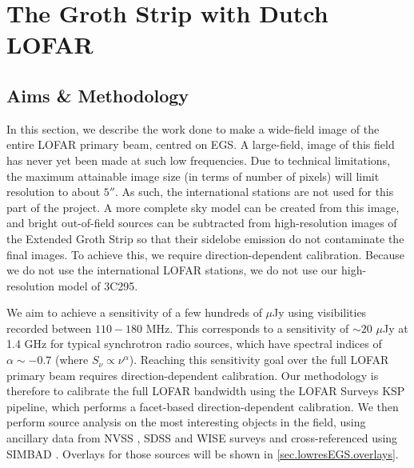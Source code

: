 \chapter{The Groth Strip with Dutch LOFAR}\label{section.EGS.lowres}
\minitoc
\section{Aims \& Methodology}

\pg
In this section, we describe the work done to make a wide-field image of the entire LOFAR primary beam, centred on EGS. A large-field, image of this field has never yet been made at such low frequencies. Due to technical limitations, the maximum attainable image size (in terms of number of pixels) will limit resolution to about $5''$. As such, the international stations are not used for this part of the project.
A more complete sky model can be created from this image, and %
bright out-of-field sources can be subtracted from high-resolution images of the Extended Groth Strip so that their sidelobe emission do not contaminate the final images. To achieve this, we require direction-dependent calibration. Because we do not use the international LOFAR stations, we do not use our high-resolution model of 3C295. %

\pg
We aim to achieve a sensitivity of a few hundreds of $\mu$Jy using visibilities recorded between $110-180$ MHz. This corresponds to a sensitivity of $\sim20$ $\mu$Jy at 1.4 GHz for typical synchrotron radio sources, which have spectral indices of $\alpha\sim -0.7$ (where $S_\nu \propto \nu^\alpha$). Reaching this sensitivity goal over the full LOFAR primary beam requires direction-dependent calibration.
Our methodology is therefore to calibrate the full LOFAR bandwidth using the LOFAR Surveys KSP pipeline, which performs a facet-based direction-dependent calibration. We then perform source analysis on the most interesting objects in the field, using ancillary data from NVSS , SDSS  and WISE  surveys and cross-referenced using SIMBAD . Overlays for those sources will be shown in \cref{sec.lowresEGS.overlays}.


